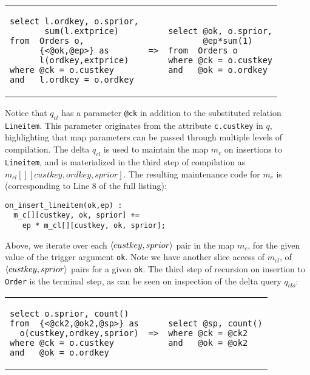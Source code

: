 \vspace{1mm}
\hspace{-5mm}
\begin{tabular}{lcl}
\begin{minipage}{1.5in}
\begin{verbatim}
select l.ordkey, o.sprior,
       sum(l.extprice)
from  Orders o,
      {<@ok,@ep>} as
      l(ordkey,extprice)
where @ck = o.custkey
and   l.ordkey = o.ordkey
\end{verbatim}
\end{minipage}
&
{\tt =>}
&
\hspace{-2mm}
\begin{minipage}{1.3in}
\begin{verbatim}
select @ok, o.sprior,
       @ep*sum(1)
from  Orders o
where @ck = o.custkey
and   @ok = o.ordkey
\end{verbatim}
\end{minipage}
\end{tabular}

\vspace{1mm}
Notice that $q_{cl}$ has a parameter {\tt @ck} in addition to the substituted
relation {\tt Lineitem}. This parameter originates from the attribute
{\tt c.custkey} in $q$, highlighting that map parameters can be passed
through multiple levels of compilation.
The delta $q_{cl}$ is used to maintain the map $m_c$ on
insertions to {\tt Lineitem}, and is materialized in the third step of
compilation as $m_{cl}[][custkey,ordkey,sprior]$. The resulting maintenance code
for $m_{c}$ is (corresponding to Line 8 of the full listing):

{\footnotesize
\begin{verbatim}
on_insert_lineitem(ok,ep) :
  m_c[][custkey, ok, sprior] +=
    ep * m_cl[][custkey, ok, sprior];
\end{verbatim}
}

Above, we iterate over each ${\langle custkey,sprior\rangle}$ pair in the map $m_c$, for
the given value of the trigger argument {\tt ok}. Note we have another slice
access of $m_{cl}$, of ${\langle custkey,sprior\rangle}$ pairs for a given \texttt{ok}.
The third step of recursion on insertion to {\tt Order} is the terminal step, as
can be seen on inspection of the delta query $q_{clo}$:

\vspace{1mm}
\hspace{-5mm}
\begin{tabular}{lcl}
\begin{minipage}{1.68in}
\begin{verbatim}
select o.sprior, count()
from  {<@ck2,@ok2,@sp>} as
  o(custkey,ordkey,sprior)
where @ck = o.custkey
and   @ok = o.ordkey
\end{verbatim}
\end{minipage}
&
{\tt =>}
&
\hspace{-3mm}
\begin{minipage}{1.3in}
\begin{verbatim}
select @sp, count()
where @ck = @ck2
and   @ok = @ok2
\end{verbatim}
\end{minipage}
\end{tabular}

